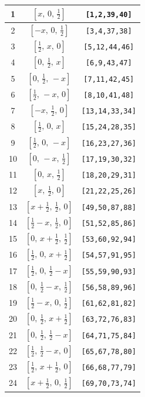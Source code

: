 \documentclass[fleqn,8pt]{jsarticle}
\begin{document}
\begin{longtable}{ccc}
1 & $\left[ x,\, 0,\, \frac{1}{2} \right]$ & {\tt [1,2,39,40]} \\ \hline
2 & $\left[ - x,\, 0,\, \frac{1}{2} \right]$ & {\tt [3,4,37,38]} \\ \hline
3 & $\left[ \frac{1}{2},\, x,\, 0 \right]$ & {\tt [5,12,44,46]} \\ \hline
4 & $\left[ 0,\, \frac{1}{2},\, x \right]$ & {\tt [6,9,43,47]} \\ \hline
5 & $\left[ 0,\, \frac{1}{2},\, - x \right]$ & {\tt [7,11,42,45]} \\ \hline
6 & $\left[ \frac{1}{2},\, - x,\, 0 \right]$ & {\tt [8,10,41,48]} \\ \hline
7 & $\left[ - x,\, \frac{1}{2},\, 0 \right]$ & {\tt [13,14,33,34]} \\ \hline
8 & $\left[ \frac{1}{2},\, 0,\, x \right]$ & {\tt [15,24,28,35]} \\ \hline
9 & $\left[ \frac{1}{2},\, 0,\, - x \right]$ & {\tt [16,23,27,36]} \\ \hline
10 & $\left[ 0,\, - x,\, \frac{1}{2} \right]$ & {\tt [17,19,30,32]} \\ \hline
11 & $\left[ 0,\, x,\, \frac{1}{2} \right]$ & {\tt [18,20,29,31]} \\ \hline
12 & $\left[ x,\, \frac{1}{2},\, 0 \right]$ & {\tt [21,22,25,26]} \\ \hline
13 & $\left[ x + \frac{1}{2},\, \frac{1}{2},\, 0 \right]$ & {\tt [49,50,87,88]} \\ \hline
14 & $\left[ \frac{1}{2} - x,\, \frac{1}{2},\, 0 \right]$ & {\tt [51,52,85,86]} \\ \hline
15 & $\left[ 0,\, x + \frac{1}{2},\, \frac{1}{2} \right]$ & {\tt [53,60,92,94]} \\ \hline
16 & $\left[ \frac{1}{2},\, 0,\, x + \frac{1}{2} \right]$ & {\tt [54,57,91,95]} \\ \hline
17 & $\left[ \frac{1}{2},\, 0,\, \frac{1}{2} - x \right]$ & {\tt [55,59,90,93]} \\ \hline
18 & $\left[ 0,\, \frac{1}{2} - x,\, \frac{1}{2} \right]$ & {\tt [56,58,89,96]} \\ \hline
19 & $\left[ \frac{1}{2} - x,\, 0,\, \frac{1}{2} \right]$ & {\tt [61,62,81,82]} \\ \hline
20 & $\left[ 0,\, \frac{1}{2},\, x + \frac{1}{2} \right]$ & {\tt [63,72,76,83]} \\ \hline
21 & $\left[ 0,\, \frac{1}{2},\, \frac{1}{2} - x \right]$ & {\tt [64,71,75,84]} \\ \hline
22 & $\left[ \frac{1}{2},\, \frac{1}{2} - x,\, 0 \right]$ & {\tt [65,67,78,80]} \\ \hline
23 & $\left[ \frac{1}{2},\, x + \frac{1}{2},\, 0 \right]$ & {\tt [66,68,77,79]} \\ \hline
24 & $\left[ x + \frac{1}{2},\, 0,\, \frac{1}{2} \right]$ & {\tt [69,70,73,74]} \\
\end{longtable}
\end{document}

